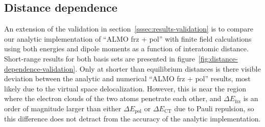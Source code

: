 \subsection{Distance dependence}
\label{ssec:results-distance-dependence}

An extension of the validation in section~\ref{sssec:results-validation} is to compare our analytic implementation of ``ALMO frz + pol'' with finite field calculations using both energies and dipole moments as a function of interatomic distance. Short-range results for both basis sets are presented in figure~\ref{fig:distance-dependence-validation}. Only at shorter than equilibrium distances is there visible deviation between the analytic and numerical ``ALMO frz + pol'' results, most likely due to the virtual space delocalization. However, this is near the region where the electron clouds of the two atoms penetrate each other, and \(\Delta E_{\text{frz}}\) is an order of magnitude larger than either \(\Delta E_{\text{pol}}\) or \(\Delta E_{\text{CT}}\) due to Pauli repulsion, so this difference does not detract from the accuracy of the analytic implementation.

